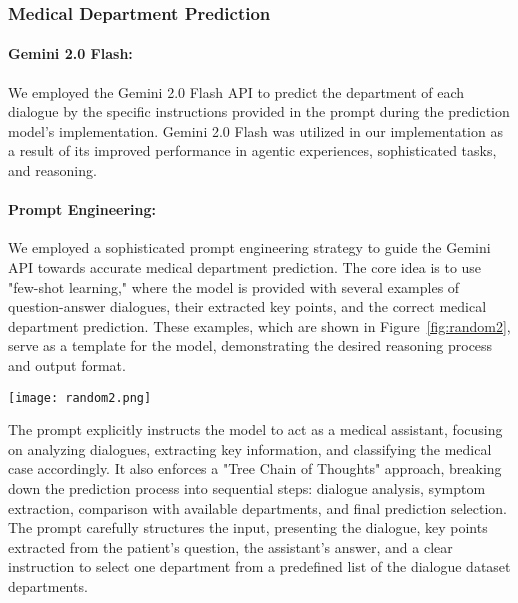 \documentclass[manuscript,screen,review]{acmart}
\begin{document}
\subsubsection{Medical Department Prediction}




\paragraph{\textbf{Gemini 2.0 Flash}:}
We employed the Gemini 2.0 Flash \cite{Gemini2.0Flash} API to predict the department of each dialogue by the specific instructions provided in the prompt during the prediction model's implementation.
Gemini 2.0 Flash \cite{Gemini2.0Flash} was utilized in our implementation as a result of its improved performance in agentic experiences, sophisticated tasks, and reasoning.

\paragraph{ \textbf{Prompt Engineering}:}
We employed a sophisticated prompt engineering strategy to guide the Gemini API towards accurate medical department prediction. The core idea is to use "few-shot learning," where the model is provided with several examples of question-answer dialogues, their extracted key points, and the correct medical department prediction. These examples, which are shown in Figure~\ref{fig:random2}, serve as a template for the model, demonstrating the desired reasoning process and output format.

\begin{figure*}[htbp]
    \centering
    \texttt{[image: random2.png]}
    \caption{A Randomly Selected Q\&A Example Utilized in the Medical Department Prediction Task Prompt}
    \label{fig:random2}
\end{figure*}

The prompt explicitly instructs the model to act as a medical assistant, focusing on analyzing dialogues, extracting key information, and classifying the medical case accordingly. It also enforces a "Tree Chain of Thoughts" approach, breaking down the prediction process into sequential steps: dialogue analysis, symptom extraction, comparison with available
departments, and final prediction selection. The prompt carefully structures the input, presenting the dialogue, key points extracted from the patient’s question, the assistant’s answer, and a clear instruction to select one department from a predefined list of the dialogue dataset departments.
\end{document}
